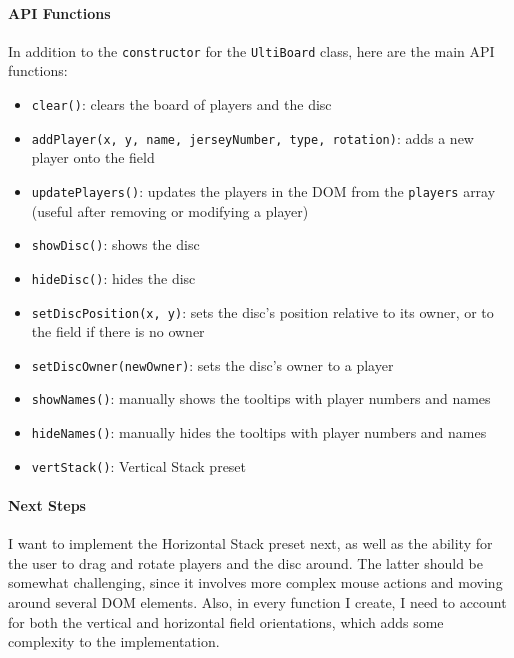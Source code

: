 \documentclass[letterpaper,11pt]{article}
\begin{document}
\newpage
\paragraph{API Functions}
In addition to the \texttt{constructor} for the \texttt{UltiBoard} class, here are the main API functions:

\begin{itemize}
  \item \texttt{clear()}: clears the board of players and the disc
  \item \texttt{addPlayer(x, y, name, jerseyNumber, type, rotation)}: adds a new player onto the field
  \item \texttt{updatePlayers()}: updates the players in the DOM from the \texttt{players} array 
                                  (useful after removing or modifying a player)
  \item \texttt{showDisc()}: shows the disc
  \item \texttt{hideDisc()}: hides the disc
  \item \texttt{setDiscPosition(x, y)}: sets the disc's position relative to its owner, or to the field if there is no owner
  \item \texttt{setDiscOwner(newOwner)}: sets the disc's owner to a player
  \item \texttt{showNames()}: manually shows the tooltips with player numbers and names
  \item \texttt{hideNames()}: manually hides the tooltips with player numbers and names
  \item \texttt{vertStack()}: Vertical Stack preset
\end{itemize}

\paragraph{Next Steps}
I want to implement the Horizontal Stack preset next, as well as the ability for the user to drag and rotate 
players and the disc around. The latter should be somewhat challenging, since it involves more complex mouse 
actions and moving around several DOM elements. Also, in every function I create, I need to account for both
the vertical and horizontal field orientations, which adds some complexity to the implementation.
\end{document}
